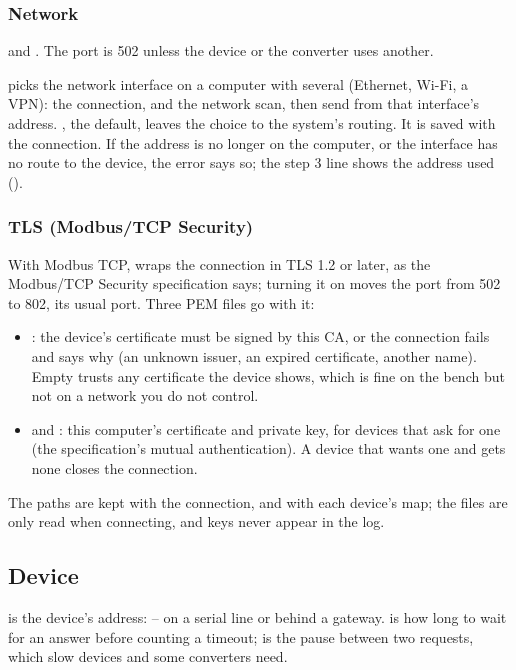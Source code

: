 \subsubsection{Network}

 and . The port is 502 unless the device or the
converter uses another.

 picks the network interface on a computer with several
(Ethernet, Wi-Fi, a VPN): the connection, and the network scan, then send from
that interface's address. , the default, leaves the choice to the
system's routing. It is saved with the connection. If the address is no longer
on the computer, or the interface has no route to the device, the error says
so; the step 3 line shows the address used ().

\subsubsection{TLS (Modbus/TCP Security)}

With Modbus TCP,  wraps the connection in TLS 1.2 or later, as the
Modbus/TCP Security specification says; turning it on moves the port from 502
to 802, its usual port. Three PEM files go with it:

\begin{itemize}
  \item {}: the device's certificate must be signed by this
    CA, or the connection fails and says why (an unknown issuer, an expired
    certificate, another name). Empty trusts any certificate the device shows,
    which is fine on the bench but not on a network you do not control.
  \item {} and : this computer's
    certificate and private key, for devices that ask for one (the
    specification's mutual authentication). A device that wants one and gets
    none closes the connection.
\end{itemize}

The paths are kept with the connection, and with each device's map; the files
are only read when connecting, and keys never appear in the log.

\subsection{Device}

 is the device's address: -- on a serial
line or behind a gateway.  is how long to wait for an
answer before counting a timeout;  is the pause between two
requests, which slow devices and some converters need.


